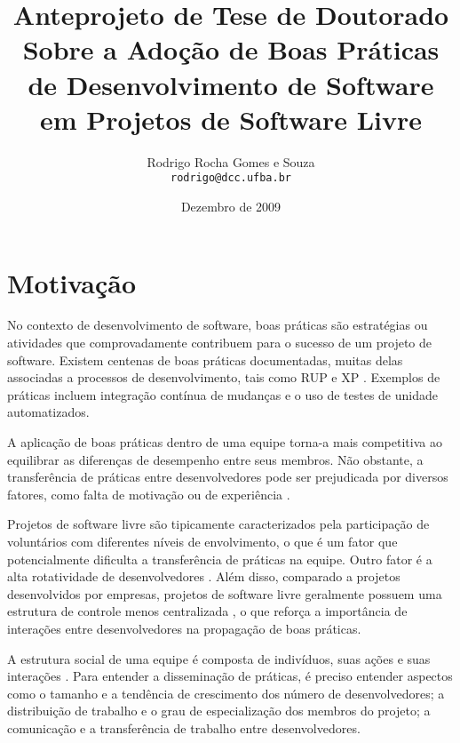 \documentclass{article}
\title{
{\small Anteprojeto de Tese de Doutorado} \\
Sobre a Adoção de Boas Práticas 
de Desenvolvimento de Software 
em Projetos de Software Livre}
\author{Rodrigo Rocha Gomes e Souza\\
\texttt{rodrigo@dcc.ufba.br}}
\date{Dezembro de 2009}
\begin{document}
\sloppy
\maketitle




\section{Motivação} %

No contexto de desenvolvimento de software, boas práticas são estratégias ou
atividades que comprovadamente contribuem para o sucesso de um projeto de
software. Existem centenas de boas práticas documentadas, muitas delas
associadas a processos de desenvolvimento, tais como RUP e XP
\cite{jacobson2007}. Exemplos de práticas incluem integração contínua de
mudanças e o uso de testes de unidade automatizados.

A aplicação de boas práticas dentro de uma equipe torna-a mais competitiva ao
equilibrar as diferenças de desempenho entre seus membros.  Não obstante, a
transferência de práticas entre desenvolvedores pode ser prejudicada por
diversos fatores, como falta de motivação ou de experiência
\cite{szulanski1996}.

Projetos de software livre são tipicamente caracterizados pela participação de
voluntários com diferentes níveis de envolvimento, o que é um fator que
potencialmente dificulta a transferência de práticas na equipe. Outro fator é a
alta rotatividade de desenvolvedores \cite{robles2006}. Além disso, comparado a
projetos desenvolvidos por empresas, projetos de software livre geralmente
possuem uma estrutura de controle menos centralizada \cite{raymond2001}, o que
reforça a importância de interações entre desenvolvedores na propagação de boas
práticas.

A estrutura social de uma equipe é composta de indivíduos, suas ações e suas
interações \cite{crowston2005}. Para entender a disseminação de práticas, é
preciso entender aspectos como o tamanho e a tendência de crescimento dos número
de desenvolvedores; a distribuição de trabalho e o grau de especialização dos
membros do projeto; a comunicação e a transferência de trabalho entre
desenvolvedores.
\end{document}
